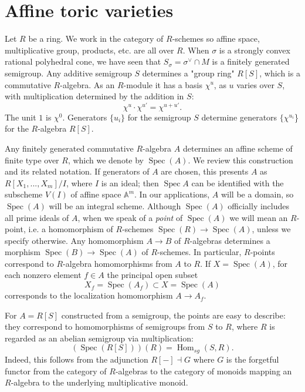 \documentclass[10pt,a4paper]{book}
\newcommand{\on}{\operatorname}
\newcommand{\s}{\on{Spec}}
\begin{document}
\section{Affine toric varieties}
Let $R$ be a ring. We work in the category of $R$-schemes so affine space, multiplicative group, products, etc.  are all over $R$.
When $\sigma$ is a strongly convex rational polyhedral cone, we have seen that $S_\sigma = \sigma^\vee \cap M$ is a finitely generated semigroup. Any additive semigroup $S$ determines a "group ring" $R[S]$, which is a commutative $R$-algebra. As an $R$-module it has a basis $\chi^u$, as $u$ varies over $S$, with multiplication determined by the addition in $S$:
\[
\chi^u\cdot \chi^{u'} = \chi^{u+u'}.
\]
The unit $1$ is $\chi^0$. Generators $\{u_i\}$ for the semigroup $S$ determine generators $\{\chi^{u_i}$\} for the $R$-algebra $R[S]$. 

Any finitely generated commutative $R$-algebra $A$ determines an affine scheme of finite type over $R$, which we denote by $\s (A)$. We review this construction and its related notation. If generators of $A$ are chosen, this presents $A$ as $R[X_1,...,X_m]/I$, where $I$ is an ideal;
then $\s A$ can be identified with the subscheme $V(I)$ of affine space $\mathbb{A}^m$. In our applications, $A$ will be a domain, so $\s (A)$ will be an integral scheme. Although $\s (A)$ officially includes all prime ideals of $A$, when we speak of a \textit{point} of $\s (A)$ we will mean an $R$-point, i.e. a homomorphism of $R$-schemes $\s (R) \to \s (A)$, unless we specify otherwise. Any homomorphism $A \to B$ of $R$-algebras determines a morphism $\s (B)\to \s (A)$ of
$R$-schemes. In particular, $R$-points correspond to $R$-algebra homomorphisms from $A$ to $R$. If $X = \s (A)$, for each nonzero element $f \in A$ the principal open subset
\[
X_f = \s(A_f) \subset X = \s (A)
\]
corresponds to the localization homomorphism $A\to A_f$. 

For $A = R[S]$ constructed from a semigroup, the points are easy to describe: they correspond to homomorphisms of semigroups from $S$ to $R$, where $R$ is regarded as an abelian semigroup via
multiplication:
\[
(\s (R[S]))(R) = \on{Hom}_{sg}(S, R).
\]
Indeed, this follows from the adjunction $R[-] \dashv G$ where $G$ is the forgetful functor from the category of $R$-algebras to the category of monoids mapping an $R$-algebra to the underlying multiplicative monoid.
\end{document}
